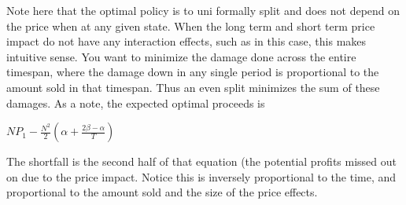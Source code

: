 \documentclass{article}
\begin{document}
Note here that the optimal policy is to uni formally split and does not depend on the price when at any given state. When the long term and short term price impact do not have any interaction effects, such as in this case, this makes intuitive sense. You want to minimize the damage done across the entire timespan, where the damage down in any single period is proportional to the amount sold in that timespan. Thus an even split minimizes the sum of these damages. As a note, the expected optimal proceeds is 
\begin{center}
$NP_1 - \frac{N^2}{2} (\alpha + \frac{2\beta - \alpha}{T})$
\end{center}
The shortfall is the second half of that equation (the potential profits missed out on due to the price impact. Notice this is inversely proportional to the time, and proportional to the amount sold and the size of the price effects.
\end{document}

